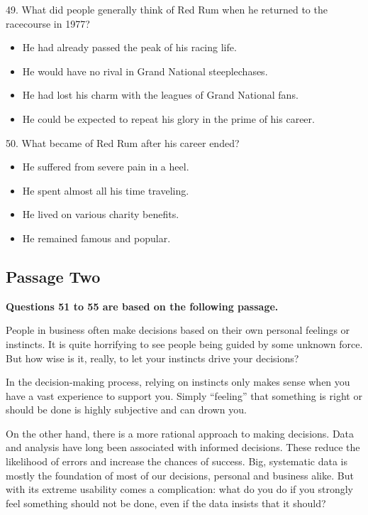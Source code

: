 \documentclass[UTF8,11pt]{ctexart}
\begin{document}
49. What did people generally think of Red Rum when he returned to the racecourse in 1977?


\begin{itemize}[leftmargin=2em,itemsep=.2em,topsep=.4em]\item[A.] He had already passed the peak of his racing life.
\item[B.] He would have no rival in Grand National steeplechases.
\item[C.] He had lost his charm with the leagues of Grand National fans.
\item[D.] He could be expected to repeat his glory in the prime of his career.
\end{itemize}

50. What became of Red Rum after his career ended?


\begin{itemize}[leftmargin=2em,itemsep=.2em,topsep=.4em]\item[A.] He suffered from severe pain in a heel.
\item[B.] He spent almost all his time traveling.
\item[C.] He lived on various charity benefits.
\item[D.] He remained famous and popular.
\end{itemize}

\subsection*{\textbf{Passage Two}}


\textbf{Questions 51 to 55 are based on the following passage.}


People in business often make decisions based on their own personal feelings or instincts. It is quite horrifying to see people being guided by some unknown force. But how wise is it, really, to let your instincts drive your decisions?


In the decision-making process, relying on instincts only makes sense when you have a vast experience to support you. Simply “feeling” that something is right or should be done is highly subjective and can drown you.


On the other hand, there is a more rational approach to making decisions. Data and analysis have long been associated with informed decisions. These reduce the likelihood of errors and increase the chances of success. Big, systematic data is mostly the foundation of most of our decisions, personal and business alike. But with its extreme usability comes a complication: what do you do if you strongly feel something should not be done, even if the data insists that it should?
\end{document}

